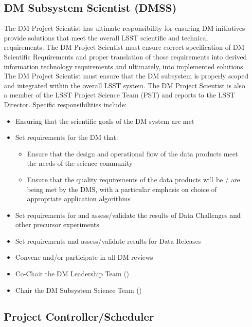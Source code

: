 \subsection{DM Subsystem Scientist (DMSS) \label{role:dmps}}

The DM Project Scientist has ultimate responsibility for ensuring DM initiatives provide solutions that meet the overall LSST scientific and technical requirements.  The DM Project Scientist must ensure correct specification of DM Scientific Requirements and proper translation of those requirements into derived information technology requirements and ultimately, into implemented solutions. The DM Project Scientist must ensure that the DM subsystem is properly scoped and integrated within the overall LSST system. The DM Project Scientist is also a member of the LSST Project Science Team (PST) and reports to the LSST Director. Specific responsibilities include:

\begin{itemize}
\item Ensuring that the scientific goals of the DM system are met
\item Set requirements for the DM that:
\begin{itemize}
\item Ensure that the design and operational flow of the data products meet the needs of the science community
\item Ensure that the quality requirements of the data products will be / are being met by the DMS, with a particular emphasis on choice of appropriate application algorithms
\end{itemize}
\item Set requirements for and assess/validate the results of Data Challenges and other precursor experiments
\item Set requirements and assess/validate results for Data Releases
\item Convene and/or participate in all DM reviews
\item Co-Chair the DM Leadership Team ()
\item Chair the DM Subsystem Science Team ()

\end{itemize}

\subsection{Project Controller/Scheduler \label{role:pcon}}

